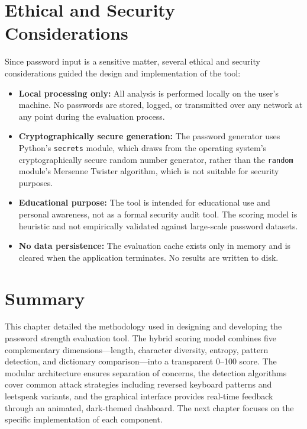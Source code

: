 \clearpage

\section{Ethical and Security Considerations}

Since password input is a sensitive matter, several ethical and security considerations guided the design and implementation of the tool:

\begin{itemize}
    \item \textbf{Local processing only:} All analysis is performed locally on the user's machine. No passwords are stored, logged, or transmitted over any network at any point during the evaluation process.

    \item \textbf{Cryptographically secure generation:} The password generator uses Python's \texttt{secrets} module, which draws from the operating system's cryptographically secure random number generator, rather than the \texttt{random} module's Mersenne Twister algorithm, which is not suitable for security purposes.

    \item \textbf{Educational purpose:} The tool is intended for educational use and personal awareness, not as a formal security audit tool. The scoring model is heuristic and not empirically validated against large-scale password datasets.

    \item \textbf{No data persistence:} The evaluation cache exists only in memory and is cleared when the application terminates. No results are written to disk.
\end{itemize}

\section{Summary}

This chapter detailed the methodology used in designing and developing the password strength evaluation tool. The hybrid scoring model combines five complementary dimensions---length, character diversity, entropy, pattern detection, and dictionary comparison---into a transparent 0--100 score. The modular architecture ensures separation of concerns, the detection algorithms cover common attack strategies including reversed keyboard patterns and leetspeak variants, and the graphical interface provides real-time feedback through an animated, dark-themed dashboard. The next chapter focuses on the specific implementation of each component.
